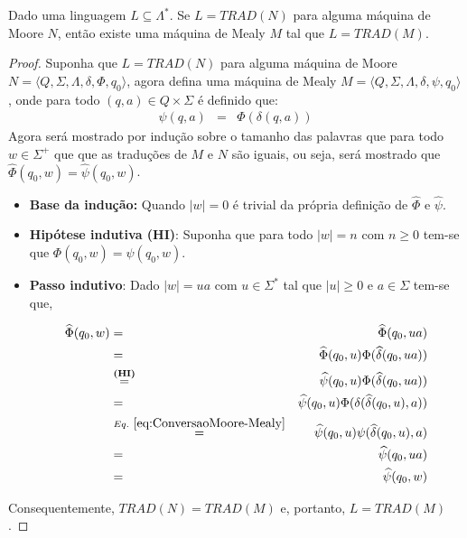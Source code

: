 \begin{theorem}\label{teo:Moore-Mealy}
	Dado uma linguagem $L \subseteq \Lambda^*$. Se $L = TRAD(N)$ para alguma máquina de Moore $N$,  então existe uma máquina de Mealy $M$ tal que $L = TRAD(M)$.
\end{theorem}

\begin{proof}
	Suponha que $L = TRAD(N)$ para alguma máquina de Moore $N = \langle Q, \Sigma, \Lambda, \delta, \Phi, q_0\rangle$, agora defina uma máquina de Mealy $M = \langle Q, \Sigma, \Lambda, \delta, \psi, q_0\rangle$, onde para todo $(q, a) \in Q \times \Sigma$ é definido que:
	\begin{eqnarray}\label{eq:ConversaoMoore-Mealy}
		\psi(q, a) & = & \Phi(\delta(q, a))
	\end{eqnarray}
	Agora será mostrado por indução sobre o tamanho das palavras que para todo $w \in \Sigma^+$ que que as traduções de $M$ e $N$ são iguais, ou seja, será mostrado que $\widehat{\Phi}(q_0, w) = \widehat{\psi}(q_0, w)$.
	\begin{itemize}
		\item \textbf{Base da indução:} Quando $|w| = 0$ é trivial da própria definição de $\widehat{\Phi}$ e $\widehat{\psi}$.
		\item \textbf{Hipótese indutiva (HI)}: Suponha que para todo $|w| = n$ com $n \geq 0$ tem-se que $\Phi(q_0, w) = \psi(q_0, w)$.
		\item \textbf{Passo indutivo}: Dado $|w| = ua$ com $u \in \Sigma^*$ tal que $|u| \geq 0$ e $a \in \Sigma$ tem-se que,
		
		\begin{eqnarray*}
			\widehat{\Phi}(q_0, w) & = & \widehat{\Phi}(q_0, ua)\\
			& = & \widehat{\Phi}(q_0, u)\Phi(\widehat{\delta}(q_0, ua))\\
			& \stackrel{\textbf{(HI)}}{=} & \widehat{\psi}(q_0, u)\Phi(\widehat{\delta}(q_0, ua))\\
			& = & \widehat{\psi}(q_0, u)\Phi(\delta(\widehat{\delta}(q_0, u), a))\\
			& \stackrel{Eq. \ \ref{eq:ConversaoMoore-Mealy}}{=} & \widehat{\psi}(q_0, u)\psi(\widehat{\delta}(q_0, u), a)\\
			& = & \widehat{\psi}(q_0, ua)\\ 
			& = & \widehat{\psi}(q_0, w)
		\end{eqnarray*}
	\end{itemize}
	Consequentemente, $TRAD(N) = TRAD(M)$ e, portanto, $L = TRAD(M)$.
\end{proof}

